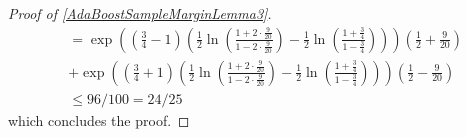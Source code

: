 \begin{proof}[Proof of \cref{AdaBoostSampleMarginLemma3}]
\begin{align*}
      &= \exp{\left(\left(\frac{3}{4}-1\right)\left(\frac{1}{2}\ln{\left(\frac{1+2\cdot\frac{9}{20}}{1-2\cdot\frac{9}{20}}\right)- \frac{1}{2}\ln{\left(\frac{1+\frac{3}{4}}{1-\frac{3}{4}} \right)}}\right)\right)}\left(\frac{1}{2}+\frac{9}{20}\right)
      \\&+\exp{\left(\left(\frac{3}{4}+1\right)\left(\frac{1}{2}\ln{\left(\frac{1+2\cdot\frac{9}{20}}{1-2\cdot\frac{9}{20}}\right)- \frac{1}{2}\ln{\left(\frac{1+\frac{3}{4}}{1-\frac{3}{4}} \right)}}\right)\right)}\left(\frac{1}{2}-\frac{9}{20}\right)
      \\&\leq 96/100=24/25
    \end{align*}
    which concludes the proof.
  \end{proof}